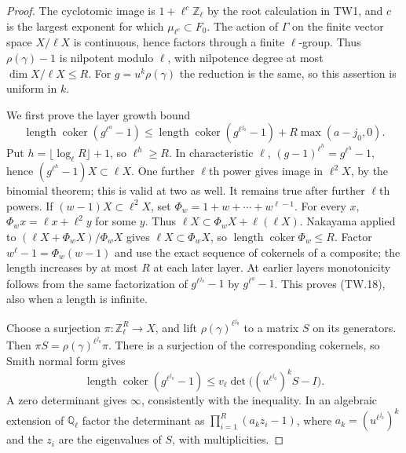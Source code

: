 \begin{proof}
The cyclotomic image is $1+\ell^c\mathbb Z_\ell$ by the
root calculation in TW1, and $c$ is the largest exponent for
which $\mu_{\ell^c}\subset F_0$.
The action of $\Gamma$ on the finite vector space $X/\ell X$
is continuous, hence factors through a finite $\ell$-group.
Thus $\rho(\gamma)-1$ is nilpotent modulo $\ell$, with
nilpotence degree at most $\dim X/\ell X\le R$.
For $g=u^k\rho(\gamma)$ the reduction is the same,
so this assertion is uniform in $k$.

We first prove the layer growth bound
\[
 \operatorname{length}\operatorname{coker}(g^{\ell^a}-1)
 \le
 \operatorname{length}\operatorname{coker}(g^{\ell^{j_0}}-1)
                +R\max(a-j_0,0).                       \tag{TW.18}
\]
Put $h=\lfloor\log_\ell R\rfloor+1$, so $\ell^h\ge R$.
In characteristic $\ell$,
$(g-1)^{\ell^h}=g^{\ell^h}-1$, hence
$(g^{\ell^h}-1)X\subset\ell X$.
One further $\ell$th power gives image in $\ell^2X$,
by the binomial theorem; this is valid at two as well.
It remains true after further $\ell$th powers.
If $(w-1)X\subset\ell^2X$, set
$\Phi_w=1+w+\cdots+w^{\ell-1}$.
For every $x$, $\Phi_wx=\ell x+\ell^2y$ for some $y$.
Thus $\ell X\subset\Phi_wX+\ell(\ell X)$.
Nakayama applied to
$(\ell X+\Phi_wX)/\Phi_wX$ gives
$\ell X\subset\Phi_wX$, so
$\operatorname{length}\operatorname{coker}\Phi_w\le R$.
Factor $w^\ell-1=\Phi_w(w-1)$ and use the exact sequence
of cokernels of a composite; the length increases by at most
$R$ at each later layer.  At earlier layers monotonicity follows
from the same factorization of $g^{\ell^{j_0}}-1$ by
$g^{\ell^a}-1$.  This proves (TW.18), also when a length is
infinite.

Choose a surjection $\pi:\mathbb Z_\ell^R\to X$, and lift
$\rho(\gamma)^{\ell^{j_0}}$ to a matrix $S$ on its generators.
Then $\pi S=\rho(\gamma)^{\ell^{j_0}}\pi$.
There is a surjection of the corresponding cokernels, so
Smith normal form gives
\[
 \operatorname{length}\operatorname{coker}
       (g^{\ell^{j_0}}-1)
 \le v_\ell\det\bigl((u^{\ell^{j_0}})^kS-I\bigr).
 \tag{TW.19}
\]
A zero determinant gives $\infty$, consistently with the
inequality.  In an algebraic extension of $\mathbb Q_\ell$
factor the determinant as
$\prod_{i=1}^R(a_k z_i-1)$, where
$a_k=(u^{\ell^{j_0}})^k$ and the $z_i$ are the eigenvalues
of $S$, with multiplicities.


\end{proof}
